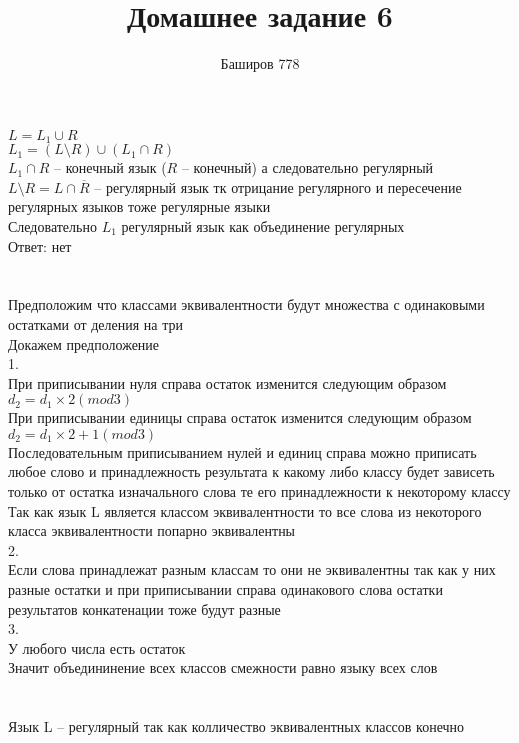 \documentclass[a4paper,12pt]{article}
\author{Баширов 778}
\title{Домашнее задание 6}
\begin{document}
\maketitle
\newpage

\section{}

\section{}
$L = L_{1}\cup R$ \\
$L_{1} = (L\setminus R)\cup (L_{1}\cap R)$\\
$L_{1}\cap R$ -- конечный язык ($R$ -- конечный) а следовательно регулярный\\
$L\setminus R = L\cap \overline{R}$ -- регулярный язык тк отрицание регулярного и пересечение регулярных языков тоже регулярные языки\\
Следовательно $L_{1}$ регулярный язык как объединение регулярных\\
Ответ: нет

\section{}
Предположим что классами эквивалентности будут множества с одинаковыми остатками от деления на три\\
Докажем предположение\\
1.\\
При приписывании нуля справа остаток изменится следующим образом\\
$d_{2} = d_{1}\times 2 (mod 3)$\\
При приписывании единицы справа остаток изменится следующим образом\\
$d_{2} = d_{1}\times 2 + 1(mod 3)$\\
Последовательным приписыванием нулей и единиц справа можно приписать любое слово и принадлежность результата к какому либо классу будет зависеть только от остатка изначального слова те его принадлежности к некоторому классу\\
Так как язык L является классом эквивалентности то все слова из некоторого класса эквивалентности попарно эквивалентны\\
2.\\
Если слова принадлежат разным классам то они не эквивалентны так как у них разные остатки и при приписывании справа одинакового слова остатки результатов конкатенации тоже будут разные\\
3.\\
У любого числа есть остаток\\
Значит объедининение всех классов смежности равно языку всех слов\\
\\
\\
Язык L -- регулярный так как колличество эквивалентных классов конечно
\end{document}
